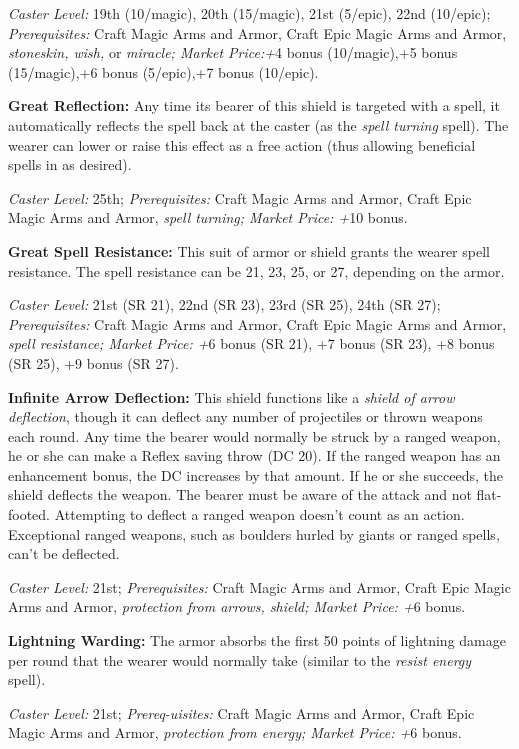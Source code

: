 \documentclass{article}
\begin{document}
\textit{Caster Level: }19th (10/magic), 20th (15/magic), 21st (5/epic), 22nd (10/epic); 
\textit{Prerequisites: }Craft Magic Arms and Armor, Craft Epic Magic Arms and Armor, 
\textit{stoneskin, wish, }or \textit{miracle; Market Price:+}4 bonus (10/magic),+5 
bonus (15/magic),+6 bonus (5/epic),+7 bonus (10/epic). 

\textbf{Great Reflection: }Any time its bearer of this shield is targeted with 
a spell, it automatically reflects the spell back at the caster (as the \textit{spell 
turning }spell). The wearer can lower or raise this effect as a free action (thus 
allowing beneficial spells in as desired). 

\textit{Caster Level: }25th; \textit{Prerequisites: }Craft Magic Arms and Armor, 
Craft Epic Magic Arms and Armor, \textit{spell turning; Market Price: +}10 bonus. 

\textbf{Great Spell Resistance: }This suit of armor or shield grants the wearer 
spell resistance. The spell resistance can be 21, 23, 25, or 27, depending on the 
armor. 

\textit{Caster Level: }21st (SR 21), 22nd (SR 23), 23rd (SR 25), 24th (SR 27); 
\textit{Prerequisites: }Craft Magic Arms and Armor, Craft Epic Magic Arms and Armor, 
\textit{spell resistance; Market Price: +}6 bonus (SR 21), +7 bonus (SR 23), +8 
bonus (SR 25), +9 bonus (SR 27). 

\textbf{Infinite Arrow Deflection: }This shield functions like a \textit{shield 
of arrow deflection}, though it can deflect any number of projectiles or thrown 
weapons each round. Any time the bearer would normally be struck by a ranged weapon, 
he or she can make a Reflex saving throw (DC 20). If the ranged weapon has an enhancement 
bonus, the DC increases by that amount. If he or she succeeds, the shield deflects 
the weapon. The bearer must be aware of the attack and not flat-footed. Attempting 
to deflect a ranged weapon doesn't count as an action. Exceptional ranged weapons, 
such as boulders hurled by giants or ranged spells\textit{, }can't be deflected. 

\textit{Caster Level: }21st; \textit{Prerequisites: }Craft Magic Arms and Armor, 
Craft Epic Magic Arms and Armor, \textit{protection from arrows, shield; Market 
Price: +}6 bonus. 

\textbf{Lightning Warding: }The armor absorbs the first 50 points of lightning 
damage per round that the wearer would normally take (similar to the \textit{resist 
energy }spell). 

\textit{Caster Level: }21st; \textit{Prereq-uisites: }Craft Magic Arms and Armor, 
Craft Epic Magic Arms and Armor, \textit{protection from energy; Market Price: 
+}6 bonus. 
\end{document}

